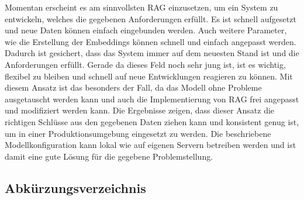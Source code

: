 \documentclass[german,report]{i1thesis}
\begin{document}
Momentan erscheint es am sinnvollsten \acl{RAG} einzusetzen, um ein System zu entwickeln, welches die gegebenen Anforderungen erfüllt.
Es ist schnell aufgesetzt und neue Daten können einfach eingebunden werden.
Auch weitere Parameter, wie die Erstellung der Embeddings können schnell und einfach angepasst werden.
Dadurch ist gesichert, dass das System immer auf dem neuesten Stand ist und die Anforderungen erfüllt.
Gerade da dieses Feld noch sehr jung ist, ist es wichtig, flexibel zu bleiben und schnell auf neue Entwicklungen reagieren zu können.
Mit diesem Ansatz ist das besonders der Fall, da das Modell ohne Probleme ausgetauscht werden kann und auch die Implementierung von \ac{RAG} frei angepasst und modifiziert werden kann.
Die Ergebnisse zeigen, dass dieser Ansatz die richtigen Schlüsse aus den gegebenen Daten ziehen kann und konsistent genug ist, um in einer Produktionsumgebung eingesetzt zu werden.
Die beschriebene Modellkonfiguration kann lokal wie auf eigenen Servern betreiben werden und ist damit eine gute Lösung für die gegebene Problemstellung.


\newpage

\begin{center}
    \section*{Abkürzungsverzeichnis}
\end{center}
\end{document}
